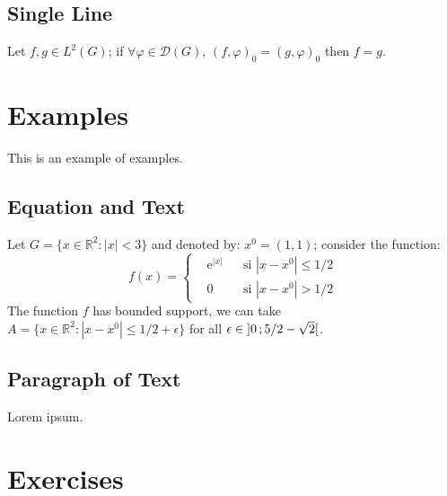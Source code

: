 \documentclass[11pt, fleqn, spanish]{book}
\begin{document}
\subsection{Single Line}

\begin{proposition} 
Let $f,g\in L^2(G)$; if $\forall \varphi\in\mathcal{D}(G)$, $(f,\varphi)_0=(g,\varphi)_0$ then $f = g$. 
\end{proposition}


\section{Examples}

This is an example of examples.

\subsection{Equation and Text}

\begin{example}
Let $G=\{x\in\mathbb{R}^2:|x|<3\}$ and denoted by: $x^0=(1,1)$; consider the function:
\begin{equation}
f(x)=\left\{\begin{aligned} & \mathrm{e}^{|x|} & & \text{si $|x-x^0|\leq 1/2$}\\
& 0 & & \text{si $|x-x^0|> 1/2$}\end{aligned}\right.
\end{equation}
The function $f$ has bounded support, we can take $A=\{x\in\mathbb{R}^2:|x-x^0|\leq 1/2+\epsilon\}$ for all $\epsilon\in\mathopen{]}0\,;5/2-\sqrt{2}\mathclose{[}$.
\end{example}

\subsection{Paragraph of Text}

\begin{example}
 Lorem ipsum.
\end{example}


\section{Exercises}
\end{document}
